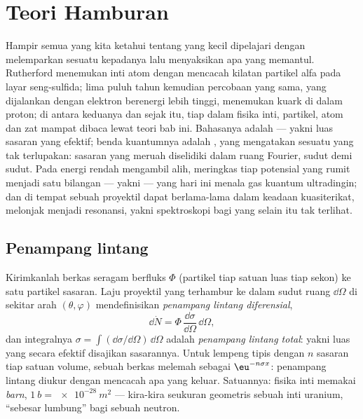 \chapter{Teori Hamburan}\label{ch:b3:scattering-theory}

Hampir semua yang kita ketahui tentang yang kecil dipelajari dengan
melemparkan sesuatu kepadanya lalu menyaksikan apa yang memantul.
Rutherford menemukan inti atom dengan mencacah kilatan partikel alfa
pada layar seng-sulfida; lima puluh tahun kemudian percobaan yang sama,
yang dijalankan dengan elektron berenergi lebih tinggi, menemukan kuark
di dalam proton; di antara keduanya dan sejak itu, tiap  dalam fisika inti, partikel, atom dan zat mampat dibaca lewat
teori bab ini. Bahasanya adalah \emph{} --- yakni luas
sasaran yang efektif; benda kuantumnya adalah \emph{},
yang  mengatakan sesuatu yang tak terlupakan: sasaran
yang meruah diselidiki dalam ruang Fourier, sudut demi sudut. Pada
energi rendah  mengambil alih, meringkas tiap
potensial yang rumit menjadi satu bilangan --- yakni 
--- yang hari ini menala gas kuantum ultradingin; dan di tempat sebuah
proyektil dapat berlama-lama dalam keadaan kuasiterikat,  melonjak menjadi resonansi, yakni spektroskopi bagi yang
selain itu tak terlihat.

\section{Penampang lintang}

\begin{definition}\label{def:b3:scattering-theory:cross-section}
Kirimkanlah berkas seragam berfluks $\Phi$ (partikel tiap satuan luas
tiap sekon) ke satu partikel sasaran. Laju proyektil yang terhambur ke
dalam sudut ruang $\dd\Omega$ di sekitar arah $(\theta,
\varphi)$ mendefinisikan \emph{penampang lintang diferensial},
\[
\dd\dot N = \Phi\,\frac{\dd\sigma}{\dd\Omega}\,\dd\Omega ,
\]
dan integralnya $\sigma = \int(\dd\sigma/\dd\Omega)\,\dd\Omega$ adalah
\emph{penampang lintang total}: yakni luas yang secara efektif
disajikan sasarannya. Untuk lempeng tipis dengan $n$ sasaran tiap
satuan volume, sebuah berkas melemah sebagai $\eu^{-n\sigma x}$:
penampang lintang diukur dengan mencacah apa yang keluar. Satuannya:
fisika inti memakai \emph{barn}, $\qty{1}{b} = \qty{e-28}{m^2}$ ---
kira-kira seukuran geometris sebuah inti uranium, ``sebesar lumbung''
bagi sebuah neutron.
\end{definition}

